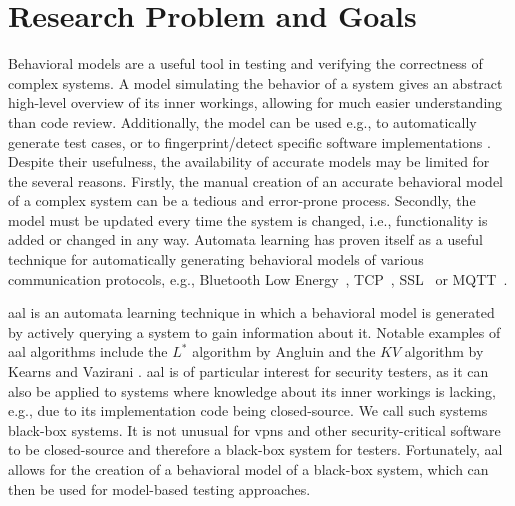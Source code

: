\section{Research Problem and Goals}
Behavioral models are a useful tool in testing and verifying the correctness of complex systems. A model simulating the behavior of a system gives an abstract high-level overview of its inner workings, allowing for much easier understanding than code review. Additionally, the model can be used e.g., to automatically generate test cases, or to fingerprint/detect specific software implementations \cite{pferscher2021fingerprinting, pferscher2022fuzzing}. Despite their usefulness, the availability of accurate models may be limited for the several reasons. Firstly, the manual creation of an accurate behavioral model of a complex system can be a tedious and error-prone process. Secondly, the model must be updated every time the system is changed, i.e., functionality is added or changed in any way. Automata learning has proven itself as a useful technique for automatically generating behavioral models of various communication protocols, e.g., Bluetooth Low Energy~\cite{pferscher2021fingerprinting}, TCP~\cite{DBLP:conf/cav/Fiterau-Brostean16}, SSL~\cite{DBLP:conf/spin/Fiterau-Brostean17} or MQTT~\cite{tappler2017}. 

\Ac{aal} is an automata learning technique in which a behavioral model is generated by actively querying a system to gain information about it. Notable examples of \ac{aal} algorithms include the $L^*$ algorithm by Angluin \cite{angluin1987learning} and the $KV$ algorithm by Kearns and Vazirani \cite{KV1994}. \ac{aal} is of particular interest for security testers, as it can also be applied to systems where knowledge about its inner workings is lacking, e.g., due to its implementation code being closed-source. We call such systems black-box systems. It is not unusual for \acp{vpn} and other security-critical software to be closed-source and therefore a black-box system for testers. Fortunately, \ac{aal} allows for the creation of a behavioral model of a black-box system, which can then be used for model-based testing approaches. 

